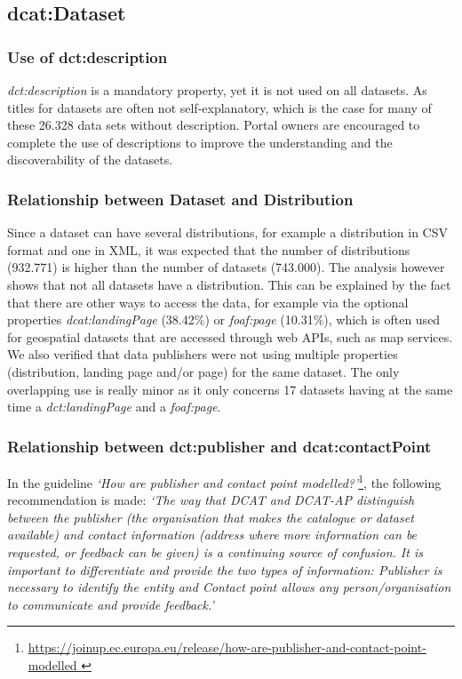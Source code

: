 \documentclass[<options>]{elsarticle}
\begin{document}
\subsection{dcat:Dataset}
\subsubsection{Use of dct:description}
\textit{dct:description} is a mandatory property, yet it is not used on all datasets. As titles for datasets are often not self-explanatory, which is the case for many of these  26.328 data sets without description. Portal owners are encouraged to complete the use of descriptions to improve the understanding and the discoverability of the datasets.

\subsubsection{Relationship between Dataset and Distribution}
Since a dataset can have several distributions, for example a distribution in CSV format and one in XML, it was expected that the number of distributions (932.771) is higher than the number of datasets (743.000). The analysis however shows that not all datasets have a distribution. This can be explained by the fact that there are other ways to access the data, for example via the optional properties \textit{dcat:landingPage} (38.42\%) or \textit{foaf:page} (10.31\%), which is often used for geospatial datasets that are accessed through web APIs, such as map services.  We also verified that data publishers were not using multiple properties (distribution, landing page and/or page) for the same dataset. The only overlapping use is really minor as it only concerns 17 datasets having at the same time a \textit{dct:landingPage} and a \textit{foaf:page}.

\subsubsection{Relationship between dct:publisher and dcat:contactPoint}
In the guideline \textit{‘How are publisher and contact point modelled?’}\footnote{\href{ https://joinup.ec.europa.eu/release/how-are-publisher-and-contact-point-modelled }{ https://joinup.ec.europa.eu/release/how-are-publisher-and-contact-point-modelled }}, the following recommendation is made:
\textit{‘The way that DCAT and DCAT-AP distinguish between the publisher (the organisation that makes the catalogue or dataset available) and contact information (address where more information can be requested, or feedback can be given) is a continuing source of confusion. It is important to differentiate and provide the two types of information: Publisher is necessary to identify the entity and Contact point allows any person/organisation to communicate and provide feedback.’}
\end{document}
